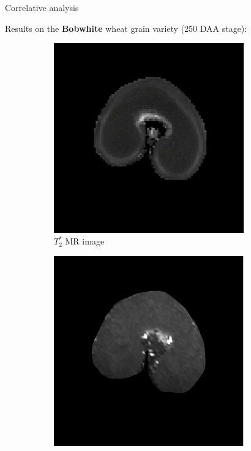 \documentclass[10pt]{beamer}
\begin{document}
\begin{frame}{Correlative analysis}

  Results on the \textbf{Bobwhite} wheat grain variety (250 DAA stage):

    \begin{figure}[ht]
    \centering
    \begin{subfigure}[t]{0.33\textwidth}
      \centering
      \includegraphics[width=0.9\textwidth]{fig/mri_slice8_250}
      \caption{$T_2^*$ MR image}
      \label{subfig:mri_slice8_250}
    \end{subfigure}%
    \begin{subfigure}[t]{0.33\textwidth}
      \centering
      \includegraphics[width=0.9\textwidth]{fig/zonetir_2}

\end{subfigure}
\end{figure}
\end{frame}
\end{document}
